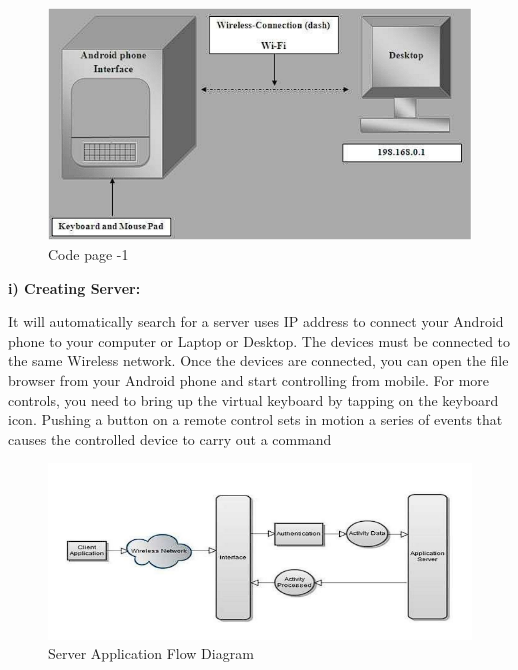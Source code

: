 \documentclass[12pt]{article}
\begin{document}
 \begin{figure}[h]
 \centering
 \includegraphics[scale=.6]{Methodology}
  \caption{Code page -1 }
 \end{figure}
 
\clearpage
 
\textbf{  i) Creating Server:}\\[2mm]\par
It will automatically search for a server uses IP address to connect your Android
phone to your computer or Laptop or Desktop. The devices must be connected to
the same Wireless network. Once the devices are connected, you can open the file
browser from your Android phone and start controlling from mobile. For more
controls, you need to bring up the virtual keyboard by tapping on the keyboard
icon. Pushing a button on a remote control sets in motion a series of events that
causes the controlled device to carry out a command\par 
\begin{figure}[h]
 \centering
 \includegraphics[scale=.5]{Methodology2}
  \caption{Server Application Flow Diagram}
 \end{figure}
\end{document}
